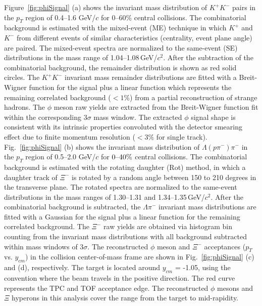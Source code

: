\documentclass[%
 reprint,	
showpacs,
 amsmath,amssymb,
 aps,
 superscriptaddress,
]{revtex4-1}
\begin{document}
Figure~\ref{fig:phiSignal} (a) shows the invariant mass distribution of $K^+K^-$ pairs in the $p_{T}$ region of 0.4--1.6 GeV/$c$ for 0--60\% central collisions. The combinatorial background is estimated with the mixed-event (ME) technique in which $K^+$ and $K^-$ from different events of similar characteristics (centrality, event plane angle) are paired. The mixed-event spectra are normalized to the same-event (SE) distributions in the mass range of 1.04--1.08\,GeV/$c^2$. After the subtraction of the combinatorial background, the remainder distribution is shown as red solid circles. The $K^+K^-$ invariant mass remainder distributions are fitted with a Breit-Wigner function for the signal plus a linear function which represents the remaining correlated background ($< 1\%$) from a partial reconstruction of strange hadrons. The $\phi$ meson raw yields are extracted from the Breit-Wigner function fit within the corresponding 3$\sigma$ mass window. The extracted $\phi$ signal shape is consistent with its intrinsic properties convoluted with the detector smearing effect due to finite momentum resolution ($<3\%$ for single track).
Fig.~\ref{fig:phiSignal} (b) shows the invariant mass distribution of $\Lambda(p\pi^-)\pi^-$ in the $p_{T}$ region of 0.5--2.0 GeV/$c$ for $\textup{0--40\%}$ central collisions. The combinatorial background is estimated with the rotating daughter (Rot) method, in which a daughter track of $\Xi^-$ is rotated by a random angle between 150 to 210 degrees in the transverse plane. The rotated spectra are normalized to the same-event distributions in the mass ranges of 1.30--1.31 and 1.34--1.35\,GeV/$c^2$. After the combinatorial background is subtracted, the $\Lambda\pi^-$ invariant mass distributions are fitted with a Gaussian for the signal plus a linear function for the remaining correlated background. The $\Xi^-$ raw yields are obtained via histogram bin counting from the invariant mass distributions with all background subtracted within mass windows of 3$\sigma$. The reconstructed $\phi$ meson and $\Xi^-$ acceptances ($p_T$ vs. $y_{cm}$) in the collision center-of-mass frame are shown in Fig.~\ref{fig:phiSignal} (c) and (d), respectively.
The target is located around $y_{cm}$ = -1.05, using the convention where the beam travels in the positive direction. The red curve represents the TPC and TOF acceptance edge. The reconstructed $\phi$ mesons and $\Xi$ hyperons in this analysis cover the range from the target to mid-rapidity.
\end{document}
